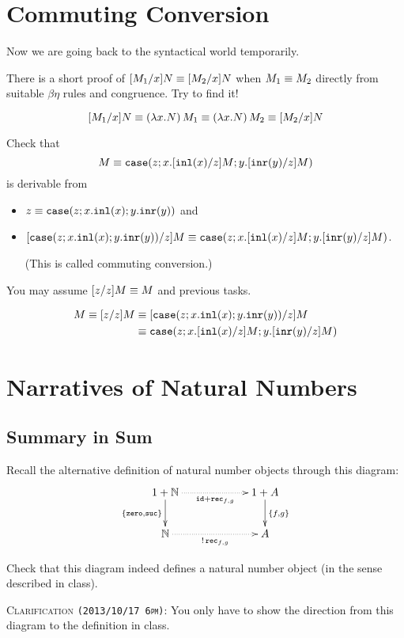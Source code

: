 \documentclass[12pt]{article}
\newcommand{\cut}[1]{}
\newcommand{\showsol}[1]{\color{FireBrick}#1\normalcolor}%
\newcommand{\showsol}[1]{\cut{#1}}%
\newenvironment{sol}{\trivlist \item[\hskip \labelsep{\bf
Solution:}]}{\endtrivlist}
\newcommand{\showextra}[1]{\color{DarkOliveGreen}#1\normalcolor}
\begin{document}
\section{Commuting Conversion}

Now we are going back to the syntactical world temporarily.

\begin{bonus}
  There is a short proof of
  $[M_1/x]N \equiv [M_2/x]N$ when $M_1 \equiv M_2$
  directly from suitable $\beta\eta$ rules and congruence.
  Try to find it!
\end{bonus}
\showsol{
  \begin{sol}
    \[
      [M_1/x]N \equiv (\lambda x.N)\,M_1 \equiv (\lambda x.N)\,M_2 \equiv [M_2/x]N
    \]
  \end{sol}
}

\begin{task}
  Check that
  \[
    M \equiv \mathtt{case}(z;x.[\mathtt{inl}(x)/z]M;y.[\mathtt{inr}(y)/z]M)
  \]
  is derivable from
  \begin{itemize}
    \item $z \equiv \mathtt{case}(z;x.\mathtt{inl}(x);y.\mathtt{inr}(y))$ and
    \item
      $[\mathtt{case}(z;x.\mathtt{inl}(x);y.\mathtt{inr}(y))/z]M \equiv \mathtt{case}(z;x.[\mathtt{inl}(x)/z]M;y.[\mathtt{inr}(y)/z]M)$.
      
      (This is called commuting conversion.)
  \end{itemize}
  You may assume $[z/z]M \equiv M$ and previous tasks.
\end{task}

\showsol{
  \begin{sol}
    \begin{align*}
      M \equiv [z/z]M &\equiv [\mathtt{case}(z;x.\mathtt{inl}(x);y.\mathtt{inr}(y))/z]M
      \\
      &\equiv \mathtt{case}(z;x.[\mathtt{inl}(x)/z]M;y.[\mathtt{inr}(y)/z]M)
    \end{align*}
  \end{sol}
}

\section{Narratives of Natural Numbers}

\subsection{Summary in Sum}

Recall the alternative definition of natural number objects
through this diagram:
\[
  \xymatrixcolsep{5pc}
  \xymatrix{
    1 + \mathbb{N} \ar@{.>}[r]_{\id + \rec_{f,g}} \ar[d]_{\copair{\zero}{\suc}}
    & 1 + A \ar[d]^{\copair{f}{g}}
    \\
    \mathbb{N} \ar@{.>}[r]_{!\,\rec_{f,g}} & A
  }
\]
\begin{task}
  Check that this diagram indeed defines a natural number object
  (in the sense described in class).
\end{task}
\showextra{
  \begin{mdframed}[style=extra]
    \textsc{Clarification \texttt{(2013/10/17 6pm)}:}
    You only have to show the direction from this diagram
    to the definition in class.
  \end{mdframed}
}
\end{document}
